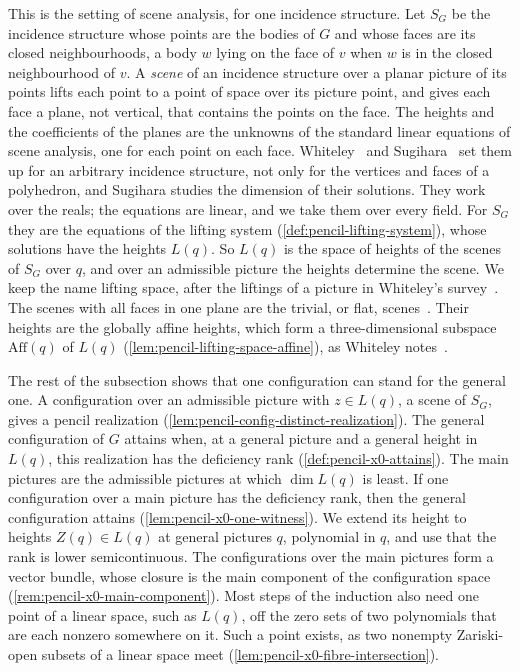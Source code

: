 This is the setting of scene analysis, for one incidence structure. Let
$S_G$ be the incidence structure whose points are the bodies of $G$ and
whose faces are its closed neighbourhoods, a body $w$ lying on the face
of $v$ when $w$ is in the closed neighbourhood of $v$. A \emph{scene} of
an incidence structure over a planar picture of its points lifts each
point to a point of space over its picture point, and gives each face a
plane, not vertical, that contains the points on the face. The heights
and the coefficients of the planes are the unknowns of the standard
linear equations of scene analysis, one for each point on each face.
Whiteley~\cite[\S\S 2.1--2.2]{whiteley1984} and
Sugihara~\cite[\S\S 2.2, 3.1]{sugihara1984} set them up for an arbitrary
incidence structure, not only for the vertices and faces of a
polyhedron, and Sugihara studies the dimension of their solutions. They
work over the reals; the equations are linear, and we take them over
every field. For $S_G$ they are the equations of the lifting system
(\cref{def:pencil-lifting-system}), whose solutions have the heights
$L(q)$. So $L(q)$ is the space of heights of the scenes of $S_G$ over
$q$, and over an admissible picture the heights determine the scene. We
keep the name lifting space, after the liftings of a picture in
Whiteley's survey~\cite[\S 8.3]{whiteley1996}. The scenes with all faces
in one plane are the trivial, or flat,
scenes~\cite[Definition~2.3]{whiteley1984}. Their heights are the
globally affine heights, which form a three-dimensional subspace
$\mathrm{Aff}(q)$ of $L(q)$ (\cref{lem:pencil-lifting-space-affine}), as
Whiteley notes~\cite[p.~78]{whiteley1989}.

The rest of the subsection shows that one configuration can stand for
the general one. A configuration over an admissible picture with
$z \in L(q)$, a scene of $S_G$, gives a pencil realization
(\cref{lem:pencil-config-distinct-realization}). The general
configuration of $G$ attains when, at a general picture and a general
height in $L(q)$, this realization has the deficiency rank
(\cref{def:pencil-x0-attains}). The main pictures are the admissible
pictures at which $\dim L(q)$ is least. If one configuration over a main
picture has the deficiency rank, then the general configuration attains
(\cref{lem:pencil-x0-one-witness}). We extend its height to heights
$Z(q) \in L(q)$ at general pictures $q$, polynomial in $q$, and use that
the rank is lower semicontinuous. The configurations over the main
pictures form a vector bundle, whose closure is the main component of the
configuration space (\cref{rem:pencil-x0-main-component}). Most steps of
the induction also need one point of a linear space, such as $L(q)$, off
the zero sets of two polynomials that are each nonzero somewhere on it.
Such a point exists, as two nonempty Zariski-open subsets of a linear
space meet (\cref{lem:pencil-x0-fibre-intersection}).

